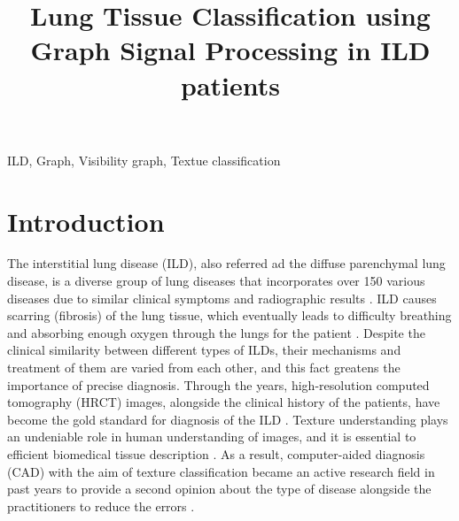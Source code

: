 \documentclass[conference]{IEEEtran}
\begin{document}
\title{Lung Tissue Classification using Graph Signal Processing in ILD patients}
\author{
\and
{}
\and
{}
\and
}

\maketitle

\begin{abstract}
\end{abstract}

\begin{IEEEkeywords}
ILD, Graph, Visibility graph, Textue classification
\end{IEEEkeywords}

\section{\large{Introduction}}
The interstitial lung disease (ILD), also referred ad the diffuse parenchymal lung disease, is a diverse group of lung diseases that incorporates over 150 various diseases due to similar clinical symptoms and radiographic results \cite{ILD_intro1}. ILD causes scarring (fibrosis) of the lung tissue, which eventually leads to difficulty breathing and absorbing enough oxygen through the lungs for the patient \cite{ILD_intro2}. Despite the clinical similarity between different types of ILDs, their mechanisms and treatment of them are varied from each other, and this fact greatens the importance of precise diagnosis\cite{dataset}. Through the years, high-resolution computed tomography (HRCT) images, alongside the clinical history of the patients, have become the gold standard for diagnosis of the ILD \cite{dataset}. Texture understanding plays an undeniable role in human understanding of images, and it is essential to efficient biomedical tissue description \cite{ILD_intro3}. As a result, computer-aided diagnosis (CAD) with the aim of texture classification became an active research field in past years to provide a second opinion about the type of disease alongside the practitioners to reduce the errors \cite{ILD_intro4}.
\end{document}
